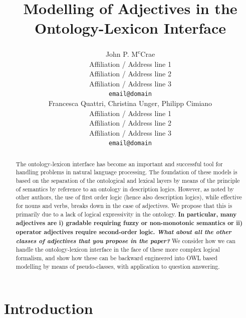 \documentclass[11pt]{article}
\title{Modelling of Adjectives in the Ontology-Lexicon Interface}
\author{John P. M\textsuperscript{c}Crae \\
  Affiliation / Address line 1 \\
  Affiliation / Address line 2 \\
  Affiliation / Address line 3 \\
  {\tt email@domain} \\\And
  Francesca Quattri, Christina Unger, Philipp Cimiano \\
  Affiliation / Address line 1 \\
  Affiliation / Address line 2 \\
  Affiliation / Address line 3 \\
  {\tt email@domain} \\}
\date{}
\begin{document}
\maketitle
\begin{abstract}
    The ontology-lexicon interface has become an important and successful tool 
for handling problems in natural language processing. The foundation of these models 
is based on the separation of the ontological and lexical layers by means of the 
principle of semantics by reference to an ontology in description logics. 
However, as noted by other authors, the use of first order logic (hence also description logics),
while effective for nouns and verbs, breaks down in the case of adjectives. 
We propose that this is primarily due to a lack of logical expressivity in the 
ontology. \textbf{In particular, many adjectives are i) gradable requiring fuzzy or 
non-monotonic semantics or ii) operator adjectives require second-order logic. \textit{What about all the other classes of adjectives that you propose in the paper?}}
We consider how we can handle the ontology-lexicon interface in the face of 
these more complex logical formalism, and show how these can be backward 
engineered into OWL based modelling by means of pseudo-classes, with application
to question answering.
\end{abstract}



\section{Introduction}
\label{intro}
\end{document}

